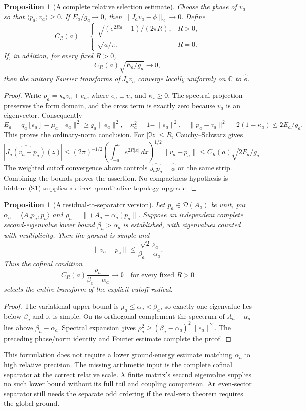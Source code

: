 \documentclass[11pt]{article}
\newtheorem{proposition}[theorem]{Proposition}
\theoremstyle{remark}
\begin{document}
\begin{proposition}[A complete relative selection estimate]
\label{prop:ns43-ccm-rayleigh-selection}
Choose the phase of $v_a$ so that $\langle p_a,v_a\rangle\ge0$.
If $E_a/g_a\to0$, then $\|J_av_a-\phi\|_2\to0$.
Define
\[
 C_R(a)=\begin{cases}
 \sqrt{(e^{2Ra}-1)/(2\pi R)},&R>0,\\
 \sqrt{a/\pi},&R=0.
 \end{cases}
\]
If, in addition, for every fixed $R>0$,
\[
 C_R(a)\sqrt{E_a/g_a}\longrightarrow0,
 \tag{S1}
\]
then the unitary Fourier transforms of $J_av_a$ converge locally
uniformly on $\mathbb C$ to $\widehat\phi$.
\end{proposition}
\begin{proof}
Write $p_a=\kappa_a v_a+e_a$, where $e_a\perp v_a$ and
$\kappa_a\ge0$. The spectral projection preserves the form domain,
and the cross term is exactly zero because $v_a$ is an eigenvector.
Consequently
\[
 E_a=q_a[e_a]-\mu_a\|e_a\|^2\ge g_a\|e_a\|^2,
 \quad \kappa_a^2=1-\|e_a\|^2,
 \quad \|p_a-v_a\|^2=2(1-\kappa_a)\le2E_a/g_a.
\]
This proves the ordinary-norm conclusion. For $|\Im z|\le R$,
Cauchy--Schwarz gives
\[
 |\widehat{J_a(v_a-p_a)}(z)|
 \le (2\pi)^{-1/2}\left(\int_{-a}^a e^{2R|x|}\,dx\right)^{1/2}
       \|v_a-p_a\|
 \le C_R(a)\sqrt{2E_a/g_a}.
\]
The weighted cutoff convergence above controls
$\widehat{J_ap_a}-\widehat\phi$ on the same strip. Combining the
bounds proves the assertion. No compactness hypothesis is hidden:
(S1) supplies a direct quantitative topology upgrade.
\end{proof}

\begin{proposition}[A residual-to-separator version]
\label{prop:ns43-ccm-residual-selection}
Let $p_a\in\mathcal D(A_a)$ be unit, put
$\alpha_a=\langle A_ap_a,p_a\rangle$ and
$\rho_a=\|(A_a-\alpha_a)p_a\|$. Suppose an independent complete
second-eigenvalue lower bound $\beta_a>\alpha_a$ is established,
with eigenvalues counted with multiplicity. Then the ground is simple and
\[
 \|v_a-p_a\|\le\frac{\sqrt2\,\rho_a}{\beta_a-\alpha_a}.
\]
Thus the cofinal condition
\[
 C_R(a)\frac{\rho_a}{\beta_a-\alpha_a}\longrightarrow0
 \quad\text{for every fixed }R>0 \tag{S1r}
\]
selects the entire transform of the explicit cutoff radical.
\end{proposition}
\begin{proof}
The variational upper bound is $\mu_a\le\alpha_a<\beta_a$, so
exactly one eigenvalue lies below $\beta_a$ and it is simple.
On its orthogonal complement the spectrum of $A_a-\alpha_a$ lies
above $\beta_a-\alpha_a$. Spectral expansion gives
$\rho_a^2\ge(\beta_a-\alpha_a)^2\|e_a\|^2$.
The preceding phase/norm identity and Fourier estimate complete the proof.
\end{proof}
This formulation does not require a lower ground-energy estimate matching
$\alpha_a$ to high relative precision. The missing arithmetic input is
the complete cofinal separator at the correct relative scale. A finite
matrix's second eigenvalue supplies no such lower bound without its full
tail and coupling comparison. An even-sector separator still needs the
separate odd ordering if the real-zero theorem requires the global ground.
\end{document}
